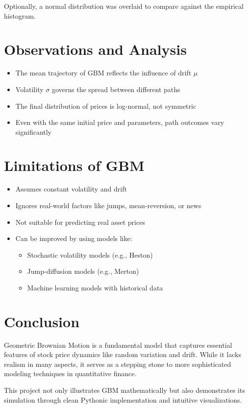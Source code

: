\documentclass[12pt]{article}
\begin{document}
Optionally, a normal distribution was overlaid to compare against the empirical histogram.

\section{Observations and Analysis}

\begin{itemize}
    \item The mean trajectory of GBM reflects the influence of drift \( \mu \)
    \item Volatility \( \sigma \) governs the spread between different paths
    \item The final distribution of prices is log-normal, not symmetric
    \item Even with the same initial price and parameters, path outcomes vary significantly
\end{itemize}

\section{Limitations of GBM}
\begin{itemize}
    \item Assumes constant volatility and drift
    \item Ignores real-world factors like jumps, mean-reversion, or news
    \item Not suitable for predicting real asset prices
    \item Can be improved by using models like:
    \begin{itemize}
        \item Stochastic volatility models (e.g., Heston)
        \item Jump-diffusion models (e.g., Merton)
        \item Machine learning models with historical data
    \end{itemize}
\end{itemize}

\section{Conclusion}
Geometric Brownian Motion is a fundamental model that captures essential features of stock price dynamics like random variation and drift. While it lacks realism in many aspects, it serves as a stepping stone to more sophisticated modeling techniques in quantitative finance.

This project not only illustrates GBM mathematically but also demonstrates its simulation through clean Pythonic implementation and intuitive visualizations.
\end{document}
